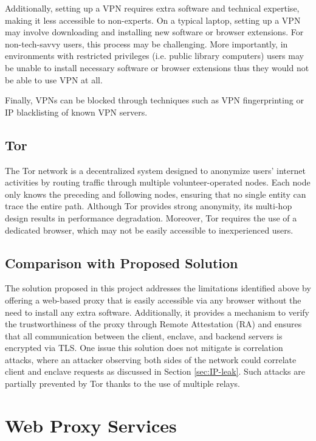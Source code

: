 Additionally, setting up a VPN requires extra software and technical expertise, making it less accessible to non-experts. On a typical laptop, setting up a VPN may involve downloading and installing new software or browser extensions. For non-tech-savvy users, this process may be challenging. More importantly, in environments with restricted privileges (i.e. public library computers) users may be unable to install necessary software or browser extensions thus they would not be able to use VPN at all.

Finally, VPNs can be blocked through techniques such as VPN fingerprinting \cite{280012} or IP blacklisting of known VPN servers.

\subsection{Tor}
The Tor network \cite{tor} is a decentralized system designed to anonymize users' internet activities by routing traffic through multiple volunteer-operated nodes. Each node only knows the preceding and following nodes, ensuring that no single entity can trace the entire path. Although Tor provides strong anonymity, its multi-hop design results in performance degradation. Moreover, Tor requires the use of a dedicated browser, which may not be easily accessible to inexperienced users. 

\subsection{Comparison with Proposed Solution}
The solution proposed in this project addresses the limitations identified above by offering a web-based proxy that is easily accessible via any browser without the need to install any extra software. Additionally, it provides a mechanism to verify the trustworthiness of the proxy through Remote Attestation (RA) and ensures that all communication between the client, enclave, and backend servers is encrypted via TLS. One issue this solution does not mitigate is correlation attacks, where an attacker observing both sides of the network could correlate client and enclave requests as discussed in Section \ref{sec:IP-leak}. Such attacks are partially \cite{evers2016thirteen} prevented by Tor thanks to the use of multiple relays.

\section{Web Proxy Services}
